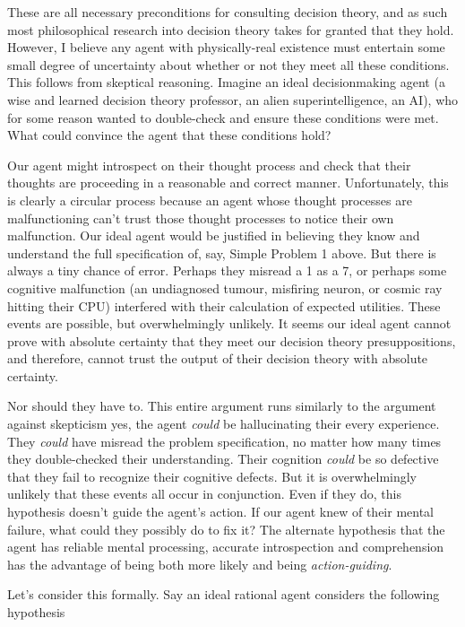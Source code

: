 \documentclass{article}
\begin{document}
These are all necessary preconditions for consulting decision theory, and as such most philosophical research into decision theory takes for granted that they hold. However, I believe any agent with physically-real existence must entertain some small degree of uncertainty about whether or not they meet all these conditions. This follows from skeptical reasoning. Imagine an ideal decisionmaking agent (a wise and learned decision theory professor, an alien superintelligence, an AI), who for some reason wanted to double-check and ensure these conditions were met. What could convince the agent that these conditions hold?

Our agent might introspect on their thought process and check that their thoughts are proceeding in a reasonable and correct manner. Unfortunately, this is clearly a circular process because an agent whose thought processes are malfunctioning can't trust those thought processes to notice their own malfunction. Our ideal agent would be justified in believing they know and understand the full specification of, say, Simple Problem 1 above. But there is always a tiny chance of error. Perhaps they misread a 1 as a 7, or perhaps some cognitive malfunction (an undiagnosed tumour, misfiring neuron, or cosmic ray hitting their CPU) interfered with their calculation of expected utilities. These events are possible, but overwhelmingly unlikely. It seems our ideal agent cannot prove with absolute certainty that they meet our decision theory presuppositions, and therefore, cannot trust the output of their decision theory with absolute certainty.

Nor should they have to. This entire argument runs similarly to the argument against skepticism \textemdash{} yes, the agent \textit{could} be hallucinating their every experience. They \textit{could} have misread the problem specification, no matter how many times they double-checked their understanding. Their cognition \textit{could} be so defective that they fail to recognize their cognitive defects. But it is overwhelmingly unlikely that these events all occur in conjunction. Even if they do, this hypothesis doesn't guide the agent's action. If our agent knew of their mental failure, what could they possibly do to fix it? The alternate hypothesis \textemdash{} that the agent has reliable mental processing, accurate introspection and comprehension \textemdash{} has the advantage of being both more likely and being \textit{action-guiding}. 

Let's consider this formally. Say an ideal rational agent considers the following hypothesis
\end{document}

